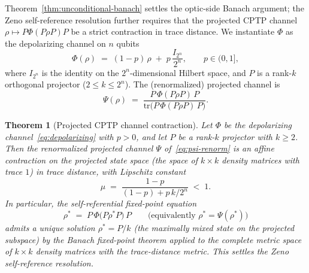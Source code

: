 \documentclass[11pt,a4paper]{article}
\theoremstyle{plain}
\newtheorem{theorem}{Theorem}[section]
\theoremstyle{definition}
\theoremstyle{remark}
\begin{document}
Theorem~\ref{thm:unconditional-banach} settles the optic-side Banach
argument; the Zeno self-reference resolution further requires that
the projected CPTP channel $\rho\mapsto P\Phi(P\rho P)P$ be a strict
contraction in trace distance. We instantiate $\Phi$ as the
depolarizing channel on $n$ qubits
\begin{equation}\label{eq:depolarizing}
  \Phi(\rho) \;=\; (1-p)\,\rho \;+\; p\,\frac{I_{2^{n}}}{2^{n}},
  \qquad p\in(0,1],
\end{equation}
where $I_{2^{n}}$ is the identity on the $2^{n}$-dimensional Hilbert
space, and $P$ is a rank-$k$ orthogonal projector ($2\leq k\leq 2^{n}$).
The (renormalized) projected channel is
\begin{equation}\label{eq:psi-renorm}
  \Psi(\rho) \;=\; \frac{P\,\Phi(P\rho P)\,P}{\mathrm{tr}\!\bigl(P\,\Phi(P\rho P)\,P\bigr)}.
\end{equation}

\begin{theorem}[Projected CPTP channel contraction]
\label{thm:zeno-contraction}
Let $\Phi$ be the depolarizing channel~\eqref{eq:depolarizing} with
$p>0$, and let $P$ be a rank-$k$ projector with $k\geq 2$. Then the
renormalized projected channel $\Psi$ of~\eqref{eq:psi-renorm} is an
affine contraction on the projected state space (the space of $k\times
k$ density matrices with trace $1$) in trace distance, with Lipschitz
constant
\begin{equation}\label{eq:mu-theory}
  \mu \;=\; \frac{1-p}{(1-p)+p\,k/2^{n}} \;<\; 1.
\end{equation}
In particular, the self-referential fixed-point equation
\begin{equation}\label{eq:zeno-fixed-eq}
  \rho^{*} \;=\; P\,\Phi\!\bigl(P\rho^{*}P\bigr)\,P
  \qquad\text{(equivalently } \rho^{*}=\Psi(\rho^{*})\text{)}
\end{equation}
admits a unique solution $\rho^{*}=P/k$ (the maximally mixed state on
the projected subspace) by the Banach fixed-point theorem applied to
the complete metric space of $k\times k$ density matrices with the
trace-distance metric. This settles the Zeno self-reference
resolution.
\end{theorem}
\end{document}
